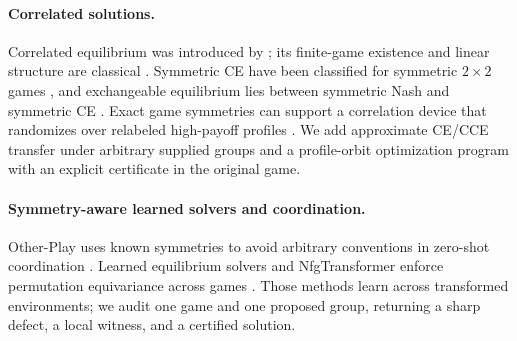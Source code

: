 \paragraph{Correlated solutions.}
Correlated equilibrium was introduced by \citet{aumann1974subjectivity}; its finite-game existence and linear structure are classical \cite{hart1989existence,papadimitriou2008computing}.  Symmetric CE have been classified for symmetric $2\times2$ games \cite{amir2017correlated}, and exchangeable equilibrium lies between symmetric Nash and symmetric CE \cite{stein2013exchangeable}.  Exact game symmetries can support a correlation device that randomizes over relabeled high-payoff profiles \cite{tewolde2025game}.  We add approximate CE/CCE transfer under arbitrary supplied groups and a profile-orbit optimization program with an explicit certificate in the original game.

\paragraph{Symmetry-aware learned solvers and coordination.}
Other-Play uses known symmetries to avoid arbitrary conventions in zero-shot coordination \cite{hu2020otherplay}.  Learned equilibrium solvers and NfgTransformer enforce permutation equivariance across games \cite{marris2022turbocharging,liu2024nfgtransformer}.  Those methods learn across transformed environments; we audit one game and one proposed group, returning a sharp defect, a local witness, and a certified solution.

